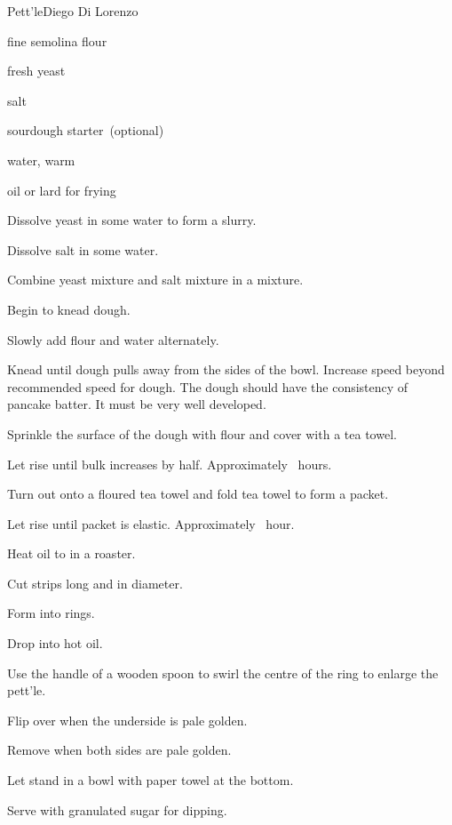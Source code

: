 \begin{recipe}{Pett'le\FIXME}{Diego Di Lorenzo}{}

\begin{ingredients}
\item {} fine semolina flour
\item {} fresh yeast
\item {} salt
\item {} sourdough starter~(optional)
\item {}\FIXME{} water, warm
\item oil or lard for frying
\end{ingredients}

\begin{directions}
\item Dissolve yeast in some water to form a slurry.
\item Dissolve salt in some water.
\item Combine yeast mixture and salt mixture in a mixture.
\item Begin to knead dough.
\item Slowly add flour and water alternately.
\item Knead until dough pulls away from the sides of the bowl. Increase speed beyond recommended speed for dough. The dough should have the consistency of pancake batter. It must be very well developed.
\item Sprinkle the surface of the dough with flour and cover with a tea towel.
\item Let rise until bulk increases by half. Approximately \threequarter{}~hours.
\item Turn out onto a floured tea towel and fold tea towel to form a packet.
\item Let rise until packet is elastic. Approximately \half{}~hour.
\item Heat oil to  in a roaster.
\item Cut strips  long and \inch{\threequarter} in diameter.
\item Form into rings.
\item Drop into hot oil.
\item Use the handle of a wooden spoon to swirl the centre of the ring to enlarge the pett'le.
\item Flip over when the underside is pale golden.
\item Remove when both sides are pale golden.
\item Let stand in a bowl with paper towel at the bottom.
\item Serve with granulated sugar for dipping.
\end{directions}

\end{recipe}
